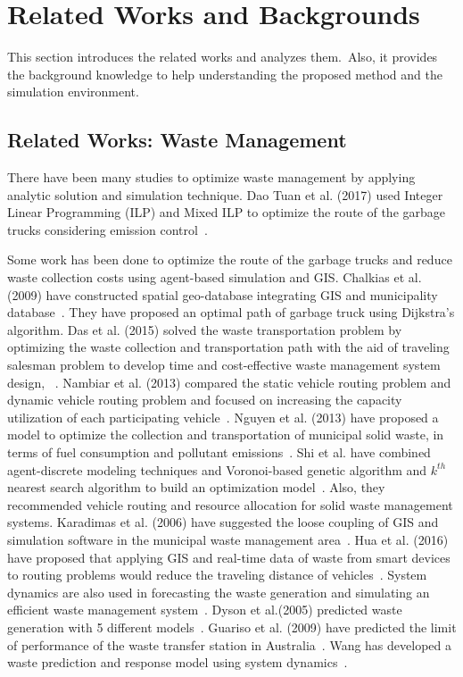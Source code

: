 \documentclass{scsSimAUDPaperFormat}
\begin{document}
\section{Related Works and Backgrounds}
This section introduces the related works and analyzes them.~Also, it provides the background knowledge to help understanding the proposed method and the simulation environment.

\subsection{Related Works: Waste Management}
There have been many studies to optimize waste management by applying analytic solution and simulation technique. Dao Tuan et al. (2017) used Integer Linear Programming (ILP) and Mixed ILP to optimize the route of the garbage trucks considering emission control~\cite{dao2017optimizing}.

Some work has been done to optimize the route of the garbage trucks and reduce waste collection costs using agent-based simulation and GIS. Chalkias et al. (2009) have constructed spatial geo-database integrating GIS and municipality database~\cite{chalkias2009gis}. They have proposed an optimal path of garbage truck using Dijkstra's algorithm. Das et al. (2015) solved the waste transportation problem by optimizing the waste collection and transportation path with the aid of traveling salesman problem to develop time and cost-effective waste management system design, ~\cite{das2015optimization}. Nambiar et al. (2013) compared the static vehicle routing problem and dynamic vehicle routing problem and focused on increasing the capacity utilization of each participating vehicle~\cite{nambiar2013multi}. Nguyen et al. (2013) have proposed a model to optimize the collection and transportation of municipal solid waste, in terms of fuel consumption and pollutant emissions~\cite{nguyenemission}. Shi et al. have combined agent-discrete modeling techniques and Voronoi-based genetic algorithm and $k^{th}$ nearest search algorithm to build an optimization model~\cite{shi2013multi}. Also, they recommended vehicle routing and resource allocation for solid waste management systems. Karadimas et al. (2006) have suggested the loose coupling of GIS and simulation software in the municipal waste management area~\cite{karadimas2006coupling}. Hua et al. (2016) have proposed that applying GIS and real-time data of waste from smart devices to routing problems would reduce the traveling distance of vehicles~\cite{hua2016towards}.
System dynamics are also used in forecasting the waste generation and simulating an efficient waste management system~\cite{guariso2009modelling,dyson2005forecasting,wang2017system}.
Dyson et al.(2005) predicted waste generation with 5 different models~\cite{dyson2005forecasting}. Guariso et al. (2009) have predicted the limit of performance of the waste transfer station in Australia~\cite{guariso2009modelling}. Wang has developed a waste prediction and response model using system dynamics~\cite{wang2017system}.
\end{document}
